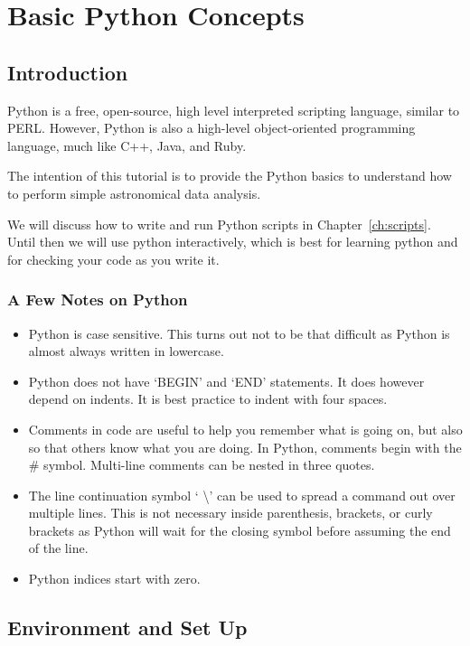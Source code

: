 \chapter{Basic Python Concepts}
\label{ch:intro}
\section{Introduction }
Python is a free, open-source, high level interpreted scripting language, similar to PERL. 
 However, Python is
also a high-level object-oriented programming language,
much like C++, Java, and Ruby.

The intention of this tutorial is to provide the Python basics
to understand how to perform simple astronomical data analysis.

We will discuss how to write and run Python scripts in Chapter~\ref{ch:scripts}.
Until then we will use python interactively, which is best for learning
python and for checking your code as you write it.

\subsection{A Few Notes on Python}
\begin{itemize}
\item Python is case sensitive.  This turns out not to be that
  difficult as Python is almost always written in lowercase.   
\item Python does not have `BEGIN' and `END'
  statements.  It does however depend on indents.  It is best practice
  to indent with four spaces.
\item Comments in code are useful to help you remember what is going
  on, but also so that others know what you are doing.  In Python,
  comments begin with the \# symbol. Multi-line comments can be nested
  in three quotes. 
\item The line continuation symbol ` \textbackslash ' can be used to
  spread a command out over multiple lines.  This is not necessary
  inside parenthesis, brackets, or curly brackets as Python will wait
  for the closing symbol before assuming the end of the line.
\item Python indices start with zero.  
\end{itemize}

\section{Environment and Set Up}
